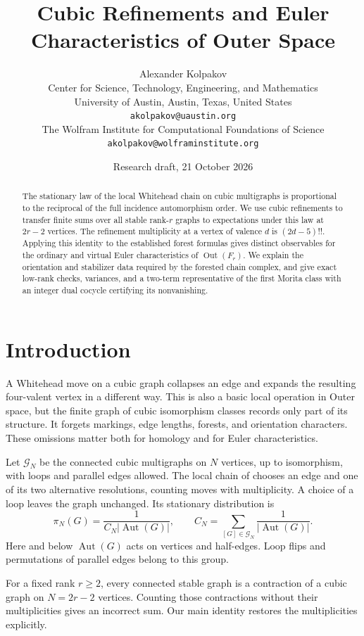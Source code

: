 \documentclass[11pt]{article}
\title{Cubic Refinements and Euler Characteristics of Outer Space}
\author{Alexander Kolpakov\\[0.5ex]
\small Center for Science, Technology, Engineering, and Mathematics\\
\small University of Austin, Austin, Texas, United States\\
\small \texttt{akolpakov@uaustin.org}\\[0.75ex]
\small The Wolfram Institute for Computational Foundations of Science\\
\small \texttt{akolpakov@wolframinstitute.org}}
\date{Research draft, 21 October 2026}
\theoremstyle{definition}
\newcommand{\Aut}{\operatorname{Aut}}
\newcommand{\Out}{\operatorname{Out}}
\numberwithin{equation}{section}
\begin{document}
\maketitle
\begin{abstract}
The stationary law of the local Whitehead chain on cubic multigraphs is
proportional to the reciprocal of the full incidence automorphism order.
We use cubic refinements to transfer finite sums over all stable
rank-$r$ graphs to expectations under this law at $2r-2$ vertices.
The refinement multiplicity at a vertex of valence $d$ is $(2d-5)!!$.
Applying this identity to the established forest formulas gives distinct
observables for the ordinary and virtual Euler characteristics of
$\Out(F_r)$. We explain the orientation and stabilizer data required by
the forested chain complex, and give exact low-rank checks, variances,
and a two-term representative of the first Morita class with an integer
dual cocycle certifying its nonvanishing.
\end{abstract}

\section{Introduction}
A Whitehead move on a cubic graph collapses an edge and expands the
resulting four-valent vertex in a different way. This is also a basic
local operation in Outer space, but the finite graph of cubic
isomorphism classes records only part of its structure. It forgets
markings, edge lengths, forests, and orientation characters.
These omissions matter both for homology and for Euler characteristics.

Let $\mathcal G_N$ be the connected cubic multigraphs on $N$ vertices,
up to isomorphism, with loops and parallel edges allowed. The local
chain of \cite{Kolpakov} chooses an edge and one of its two alternative
resolutions, counting moves with multiplicity. A choice of a loop
leaves the graph unchanged. Its stationary distribution is
\begin{equation}\label{eq:stationary}
 \pi_N(G)=\frac{1}{C_N|\Aut(G)|},\qquad
 C_N=\sum_{[G]\in\mathcal G_N}\frac1{|\Aut(G)|}.
\end{equation}
Here and below $\Aut(G)$ acts on vertices and half-edges. Loop flips
and permutations of parallel edges belong to this group.

For a fixed rank $r\ge2$, every connected stable graph is a contraction
of a cubic graph on $N=2r-2$ vertices. Counting those contractions
without their multiplicities gives an incorrect sum. Our main
identity restores the multiplicities explicitly.
\end{document}
